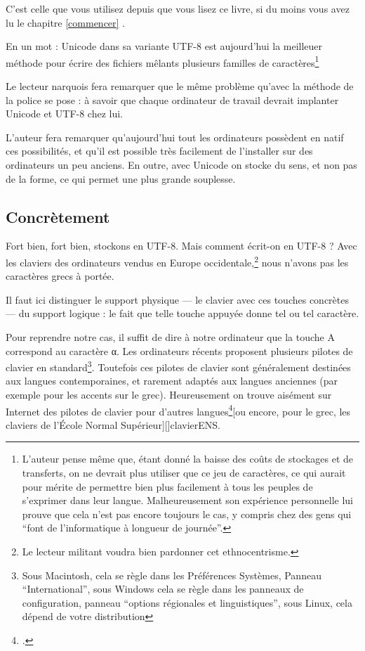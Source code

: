C'est celle que vous utilisez depuis que vous lisez ce livre, si du moins vous avez lu le chapitre \ref{commencer} .

En un mot : Unicode dans sa variante UTF-8 est aujourd'hui la meilleuer méthode pour écrire des fichiers mêlants plusieurs familles de caractères\footnote{L'auteur pense même que, étant donné la baisse des coûts de stockages et de transferts, on ne devrait plus utiliser que ce jeu de caractères, ce qui aurait pour mérite de permettre bien plus facilement à tous les peuples de s'exprimer dans leur langue. Malheureusement son expérience personnelle lui prouve que cela n'est pas encore toujours le cas, y compris chez des gens qui \enquote{font de l'informatique à longueur de journée}.}

\begin{anedocte}Le lecteur narquois fera remarquer que le même problème qu'avec la méthode de la police se pose : à savoir que chaque ordinateur de travail devrait implanter Unicode et UTF-8 chez lui. 

L'auteur fera remarquer qu'aujourd'hui tout les ordinateurs possèdent en natif ces possibilités, et qu'il est possible très facilement de l'installer sur des ordinateurs un peu anciens. En outre, avec Unicode on stocke du sens, et non pas de la forme, ce qui permet une plus grande souplesse. 

\end{anedocte}

\subsection{Concrètement}

Fort bien, fort bien, stockons en UTF-8. Mais comment écrit-on en UTF-8 ? Avec les claviers des ordinateurs vendus en Europe occidentale,\footnote{Le lecteur militant voudra bien pardonner cet ethnocentrisme.} nous n'avons pas les caractères grecs à portée.

Il faut ici distinguer le support physique --- le clavier avec ces touches concrètes --- du support logique : le fait que telle touche appuyée donne tel ou tel caractère. 

Pour reprendre notre cas, il suffit de dire à notre ordinateur que la touche A correspond au caractère α. Les ordinateurs récents proposent plusieurs pilotes de clavier en standard\footnote{Sous Macintosh, cela se règle dans les Préférences Systèmes, Panneau \enquote{International}, sous Windows cela se règle dans les panneaux de configuration, panneau \enquote{options régionales et linguistiques}, sous Linux, cela dépend de votre distribution}. Toutefois ces pilotes de clavier sont généralement destinées aux langues contemporaines, et rarement adaptés aux langues anciennes (par exemple pour les accents sur le grec). Heureusement on trouve aisément sur Internet des pilotes de clavier pour d'autres langues\footcite[Pour ce qui concerne le grec ancien, le syriaque, l'hébreu ancien, on pourra utiliser les claviers proposés par Michel Langlois][,~]{clavierLanglois}[ou encore, pour le grec, les claviers de l'École Normal Supérieur][]{clavierENS}.


